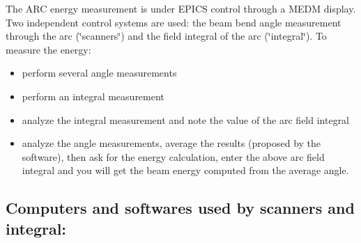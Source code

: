 
\providecommand{\LyX}{L\kern-.1667em\lower.25em\hbox{Y}\kern-.125emX\@}

\newenvironment{lyxlist}[1]
  {\begin{list}{}
    {\settowidth{\labelwidth}{#1}
     \setlength{\leftmargin}{\labelwidth}
     \addtolength{\leftmargin}{\labelsep}
     \renewcommand{\makelabel}[1]{##1 \hfill}}}
  {\end{list}}

\newenvironment{lyxcode}
  {\begin{list}{}{
    \setlength{\rightmargin}{\leftmargin}
    \raggedright
    \setlength{\itemsep}{0pt}
    \setlength{\parsep}{0pt}
    \ttfamily}%
   \item[]}
  {\end{list}}

The ARC energy measurement is under EPICS control through a MEDM display. Two
independent control systems are used: the beam bend angle measurement through
the arc (\char`\"{}scanners\char`\"{}) and the field integral of
the arc (\char`\"{}integral\char`\"{}). To measure the energy: 

\begin{itemize}
\item perform several angle measurements 
\item perform an integral measurement 
\item analyze the integral measurement and note the value of the arc field integral 
\item analyze the angle measurements, average the results (proposed by the software),
then ask for the energy calculation, enter the above arc field integral and
you will get the beam energy computed from the average angle. 
\end{itemize}

\subsection{Computers and softwares used by scanners and integral: }

